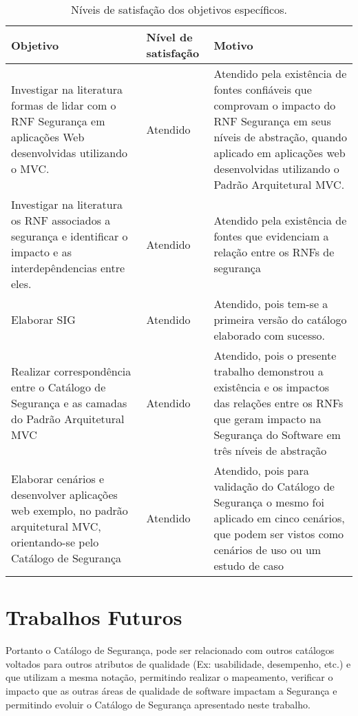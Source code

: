 \begin{table}[h!]
	\centering
	\caption{Níveis de satisfação dos objetivos específicos.}
	\label{resultadosObtidos}
	\tiny
	\begin{tabular}{@{}p{6cm}p{3cm}p{6cm}@{}}
		\toprule
		\textbf{Objetivo} & \textbf{Nível de satisfação} & \textbf{Motivo} \\ \midrule
		Investigar na literatura formas de lidar com o RNF Segurança  em aplicações Web desenvolvidas utilizando o MVC. &  Atendido & Atendido pela existência de fontes confiáveis que comprovam o impacto do RNF Segurança em seus níveis de abstração, quando aplicado em aplicações web desenvolvidas utilizando o Padrão Arquitetural MVC. \\
		\rowcolor[HTML]{C0C0C0} 
		Investigar na literatura os RNF associados a segurança e identificar o impacto e as interdepêndencias entre eles. & Atendido &  Atendido pela existência de fontes que evidenciam a relação entre os RNFs de segurança \\
		Elaborar SIG & Atendido & Atendido, pois tem-se a primeira versão do catálogo elaborado com sucesso. \\
		\rowcolor[HTML]{C0C0C0} 
		Realizar correspondência entre o Catálogo de Segurança e as camadas do Padrão Arquitetural MVC & Atendido & Atendido, pois o presente trabalho demonstrou a existência e os impactos das relações entre os RNFs que geram impacto na Segurança do Software em três níveis de abstração \\
		
		Elaborar cenários e desenvolver aplicações web exemplo, no padrão arquitetural MVC, orientando-se pelo Catálogo de Segurança & Atendido & Atendido, pois para validação do Catálogo de Segurança o mesmo foi aplicado em cinco cenários, que podem ser vistos como cenários de uso ou um estudo de caso \\
		 \bottomrule
	\end{tabular}
\end{table}

\section*{Trabalhos Futuros}

Portanto o Catálogo de Segurança, pode ser relacionado com outros catálogos voltados para outros atributos de qualidade (Ex: usabilidade, desempenho, etc.) e que utilizam a mesma notação, permitindo realizar o mapeamento, verificar o impacto que as outras áreas de qualidade de software impactam a Segurança e permitindo evoluir o Catálogo de Segurança apresentado neste trabalho. 

